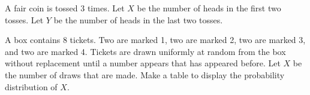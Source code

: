 \documentclass[addpoints,12pt]{exam}
\begin{document}
\begin{questions}
\question[3] A fair coin is tossed 3 times. Let $X$ be the number of heads in the first two tosses. Let $Y$ be the number of heads in the last two tosses.

\noaddpoints
{}
\addpoints

\question[2] A box contains 8 tickets. Two are marked 1, two are marked 2, two are marked 3, and two are marked 4. Tickets are drawn uniformly at random from the box without replacement until a number appears that has appeared before. Let $X$ be the number of draws that are made. Make a table to display the probability distribution of $X$.

\end{questions}
\end{document}
